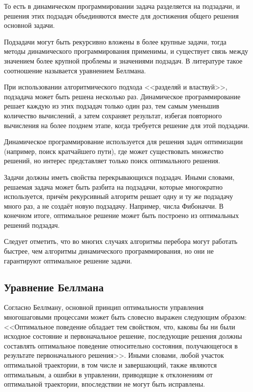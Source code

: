 То есть в динамическом программировании задача разделяется на подзадачи, и решения этих подзадач объединяются вместе для достижения общего решения основной задачи.

Подзадачи могут быть рекурсивно вложены в более крупные задачи, тогда методы динамического программирования применимы, и существует связь между значением более крупной проблемы и значениями подзадач. В литературе такое соотношение называется уравнением Беллмана.

При использовании алгоритмического подхода <<разделяй и властвуй>>, подзадача может быть решена несколько раз. Динамическое программирование решает каждую из этих подзадач только один раз, тем самым уменьшив количество вычислений, а затем сохраняет результат, избегая повторного вычисления на более позднем этапе, когда требуется решение для этой подзадачи.

Динамическое программирование используется для решения задач оптимизации (например, поиск кратчайшего пути), где может существовать множество решений, но интерес представляет только поиск оптимального решения.

Задачи должны иметь свойства перекрывающихся подзадач. Иными словами, решаемая задача может быть разбита на подзадачи, которые многократно используется, причём рекурсивный алгоритм решает одну и ту же подзадачу много раз, а не создаёт новую подзадачу. Например, числа Фибоначчи. В конечном итоге, оптимальное решение может быть построено из оптимальных решений подзадач.

Следует отметить, что во многих случаях алгоритмы перебора могут работать быстрее, чем алгоритмы динамического программирования, но они не гарантируют оптимальное решение задачи.

\subsection{Уравнение Беллмана}

\indent Согласно Беллману, основной принцип оптимальности управления многошаговыми процессами может быть словесно выражен следующим образом: <<Оптимальное поведение обладает тем свойством, что, каковы бы ни были исходное состояние и первоначальное решение, последующие решения должны составлять оптимальное поведение относительно состояния, получающегося в результате первоначального решения>>. Иными словами, любой участок оптимальной траектории, в том числе и завершающий, также являются оптимальным, а ошибки в управлении, приводящие к отклонениям от оптимальной траектории, впоследствии не могут быть исправлены.

